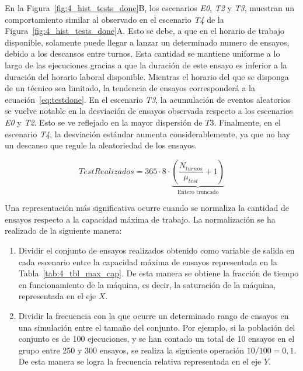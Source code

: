En la Figura~\ref{fig:4_hist_tests_done}B,
los escenarios \textit{E0}, \textit{T2} y \textit{T3},
muestran un comportamiento similar al observado en
el escenario \textit{T4} de la Figura~\ref{fig:4_hist_tests_done}A.
Esto se debe, a que en el horario de trabajo disponible,
solamente puede llegar a lanzar un determinado numero de ensayos,
debido a los descansos entre turnos.
Esta cantidad se mantiene uniforme a lo largo de las ejecuciones
gracias a que la duración de este ensayo es inferior
a la duración del horario laboral disponible.
Mientras el horario del que se disponga de un técnico sea limitado,
la tendencia de ensayos corresponderá a la ecuación~\eqref{eq:testdone}.
En el escenario \textit{T3},
la acumulación de eventos aleatorios se vuelve notable
en la desviación de ensayos observada respecto a
los escenarios \textit{E0} y \textit{T2}.
Esto se ve reflejado en la mayor dispersión de $T3$.
Finalmente, en el escenario \textit{T4}, la desviación estándar
aumenta considerablemente, ya que no hay un descanso
que regule la aleatoriedad de los ensayos.

\begin{equation}
	Test Realizados = 365 \cdot 8 \cdot 
	\underbrace{
		\left(\frac{N_{turnos}}{\mu_{test}} + 1\right)
	}_{\text{Entero truncado}}
	\label{eq:testdone}
\end{equation}

Una representación más significativa ocurre
cuando se normaliza la cantidad de ensayos respecto
a la capacidad máxima de trabajo.
La normalización se ha realizado de la siguiente manera:

\begin{enumerate}
	\item Dividir el conjunto de ensayos realizados
		obtenido como variable de salida en cada escenario
		entre la capacidad máxima de ensayos
		representada en la Tabla~\ref{tab:4_tbl_max_cap}.
		De esta manera se obtiene la fracción de
		tiempo en funcionamiento de la máquina, es decir,
		la saturación de la máquina, representada en el eje $X$.
	\item Dividir la frecuencia con la que ocurre
		un determinado rango de ensayos en una simulación
		entre el tamaño del conjunto.
		Por ejemplo, si la población del conjunto es de 100 ejecuciones,
		y se han contado un total de 10 ensayos en el grupo
		entre 250 y 300 ensayos,
		se realiza la siguiente operación $10 / 100 = 0,1$.
		De esta manera se logra la frecuencia relativa
		representada en el eje $Y$.
\end{enumerate}

